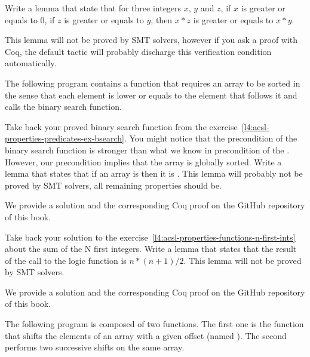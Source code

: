 


Write a lemma that state that for three integers $x$, $y$ and $z$, if $x$ is
greater or equals to $0$, if $z$ is greater or equals to $y$, then $x * z$ is
greater or equals to $x * y$.


This lemma will not be proved by SMT solvers, however if you ask a proof with
Coq, the default tactic will probably discharge this verification condition
automatically.


\label{l4:acsl-properties-lemmas-lsorted-gsorted}


The following program contains a function that requires an array to be sorted
in the sense that each element is lower or equals to the element that follows it
and calls the binary search function.




Take back your proved binary search function from the
exercise~\ref{l4:acsl-properties-predicates-ex-bsearch}. You might notice that
the precondition of the binary search function is stronger than what we know in
precondition of the . However, our precondition
implies that the array is globally sorted. Write a lemma that states that if
an array is  then it is .
This lemma will probably not be proved by SMT solvers, all remaining properties
should be.

We provide a solution and the corresponding Coq proof on the GitHub repository
of this book.


\label{l4:acsl-properties-lemmas-n-first-ints}

Take back your solution to the
exercise~\ref{l4:acsl-properties-functions-n-first-ints} about the sum of the
N first integers. Write a lemma that states that the result of the call to the
logic function is $n*(n+1)/2$. This lemma will not be proved by SMT solvers.


We provide a solution and the corresponding Coq proof on the GitHub repository
of this book.


\label{l4:acsl-properties-lemmas-shift-trans}


The following program is composed of two functions. The first one is the
 function that shifts the elements of an array with a
given offset (named ). The second performs two successive
shifts on the same array.


